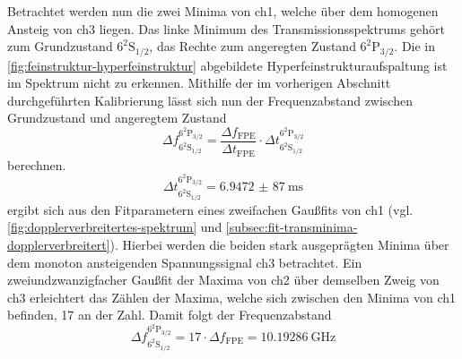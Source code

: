 \documentclass[../bericht.tex]{subfiles}
\begin{document}
        Betrachtet werden nun die zwei Minima von ch1, welche über dem homogenen Ansteig von ch3 liegen. Das linke Minimum des Transmissionsspektrums gehört zum Grundzustand $\mathrm{6^2S_{1/2}}$, das Rechte zum angeregten Zustand $\mathrm{6^2P_{3/2}}$. Die in \cref{fig:feinstruktur-hyperfeinstruktur} abgebildete Hyperfeinstrukturaufspaltung ist im Spektrum nicht zu erkennen. Mithilfe der im vorherigen Abschnitt durchgeführten Kalibrierung lässt sich nun der Frequenzabstand zwischen Grundzustand und angeregtem Zustand
        \begin{equation*}
          \Delta f_\mathrm{6^2S_{1/2}}^\mathrm{6^2P_{3/2}} = \frac{\Delta f_\mathrm{FPE}}{\Delta t_\mathrm{FPE}}\cdot \Delta t_\mathrm{6^2S_{1/2}}^\mathrm{6^2P_{3/2}}
        \end{equation*}
        berechnen.
        \begin{equation*}
          \Delta t_\mathrm{6^2S_{1/2}}^\mathrm{6^2P_{3/2}}= \SI{6,9472(87)}{\milli\second}
        \end{equation*}
        ergibt sich aus den Fitparametern eines zweifachen Gau\ss{}fits von ch1 (vgl. \cref{fig:dopplerverbreitertes-spektrum} und \cref{subsec:fit-transminima-dopplerverbreitert}). Hierbei werden die beiden stark ausgeprägten Minima über dem monoton ansteigenden Spannungssignal ch3 betrachtet. Ein zweiundzwanzigfacher Gau\ss{}fit der Maxima von ch2 über demselben Zweig von ch3 erleichtert das Zählen der Maxima, welche sich zwischen den Minima von ch1 befinden, 17 an der Zahl. Damit folgt der Frequenzabstand
        \begin{equation*}
          \Delta f_\mathrm{6^2S_{1/2}}^\mathrm{6^2P_{3/2}} = 17 \cdot \Delta f_\mathrm{FPE} = \SI{10,19286}{\giga\hertz}
        \end{equation*}
\end{document}

